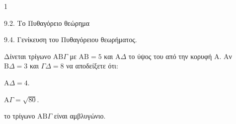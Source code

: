 \begin{ylh}{1}
    \item 9.2. Το Πυθαγόρειο θεώρημα
    \item 9.4. Γενίκευση του Πυθαγόρειου θεωρήματος.
\end{ylh}
\begin{figure} %
    \centering %
\end{figure}
Δίνεται τρίγωνο $\text{AB}\Gamma$ με $\text{AB} = 5$ και $\text{A}\Delta$ το ύψος του από την κορυφή $\text{A}$. Αν $\text{B}\Delta = 3$ και $\Gamma\Delta = 8$ να αποδείξετε ότι:
\begin{alist}
    \item $\text{A}\Delta = 4$. 
    \item $\text{A}\Gamma = \sqrt{80}$. 
    \item το τρίγωνο $\text{AB}\Gamma$ είναι αμβλυγώνιο. 
\end{alist}
